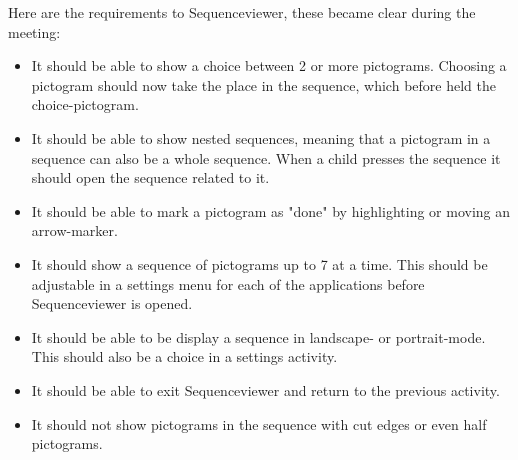 Here are the requirements to Sequenceviewer, these became clear during the meeting:
\begin{itemize}
\item It should be able to show a choice between 2 or more pictograms. Choosing a pictogram should now take the place in the sequence, which before held the choice-pictogram.
\item It should be able to show nested sequences, meaning that a pictogram in a sequence can also be a whole sequence. When a child presses the sequence it should open the sequence related to it.
\item It should be able to mark a pictogram as "done" by highlighting or moving an arrow-marker.
\item It should show a sequence of pictograms up to 7 at a time. This should be adjustable in a settings menu for each of the applications before Sequenceviewer is opened.
\item It should be able to be display a sequence in landscape- or portrait-mode. This should also be a choice in a settings activity.
\item It should be able to exit Sequenceviewer and return to the previous activity.
\item It should not show pictograms in the sequence with cut edges or even half pictograms.
\end{itemize}